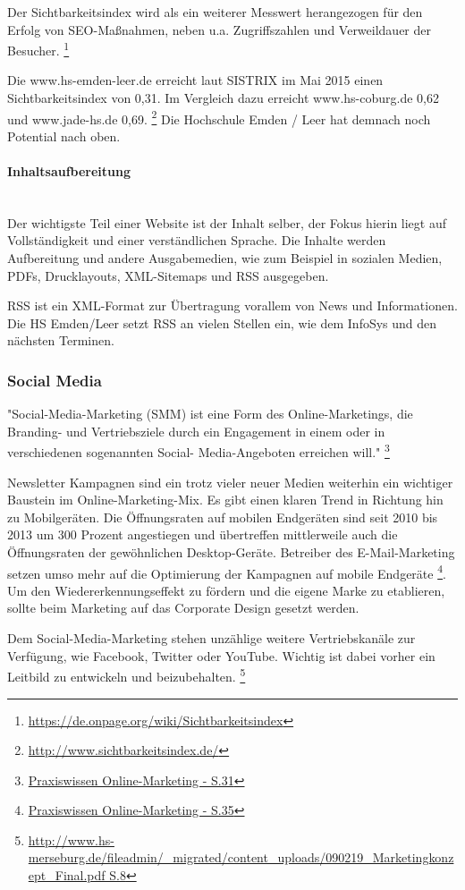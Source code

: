 \documentclass[a4paper, 12pt]{scrreprt}
\begin{document}
Der Sichtbarkeitsindex wird als ein weiterer Messwert herangezogen für den Erfolg von SEO-Maßnahmen, neben u.a. Zugriffszahlen und Verweildauer der Besucher. \footnote{\url{https://de.onpage.org/wiki/Sichtbarkeitsindex}}

Die www.hs-emden-leer.de erreicht laut SISTRIX im Mai 2015 einen Sichtbarkeitsindex von 0,31. Im Vergleich dazu erreicht www.hs-coburg.de 0,62 und www.jade-hs.de 0,69. \footnote{\url{http://www.sichtbarkeitsindex.de/}} Die Hochschule Emden / Leer hat demnach noch Potential nach oben.

\paragraph{Inhaltsaufbereitung}\mbox{}\\ %
Der wichtigste Teil einer Website ist der Inhalt selber, der Fokus hierin liegt auf Vollständigkeit und einer verständlichen Sprache. Die Inhalte werden Aufbereitung und andere Ausgabemedien, wie zum Beispiel in sozialen Medien, PDFs, Drucklayouts, XML-Sitemaps und RSS ausgegeben.

RSS ist ein XML-Format zur Übertragung vorallem von News und Informationen. Die HS Emden/Leer setzt RSS an vielen Stellen ein, wie dem InfoSys und den nächsten Terminen.

\subsubsection{Social Media}
"Social-Media-Marketing (SMM) ist eine Form des Online-Marketings, die Branding- und Vertriebsziele durch ein Engagement in einem oder in verschiedenen sogenannten Social- Media-Angeboten erreichen will." \footnote{\url{Praxiswissen Online-Marketing - S.31}}

Newsletter Kampagnen sind ein trotz vieler neuer Medien weiterhin ein wichtiger Baustein im Online-Marketing-Mix. Es gibt einen klaren Trend in Richtung hin zu Mobilgeräten. Die Öffnungsraten auf mobilen Endgeräten sind seit 2010 bis 2013 um 300 Prozent angestiegen und übertreffen mittlerweile auch die Öffnungsraten der gewöhnlichen Desktop-Geräte. Betreiber des E-Mail-Marketing setzen umso mehr auf die Optimierung der Kampagnen auf mobile Endgeräte \footnote{\url{Praxiswissen Online-Marketing - S.35}}. Um den Wiedererkennungseffekt zu fördern und die eigene Marke zu etablieren, sollte beim Marketing auf das Corporate Design gesetzt werden.

Dem Social-Media-Marketing stehen unzählige weitere Vertriebskanäle zur Verfügung, wie Facebook, Twitter oder YouTube. Wichtig ist dabei vorher ein Leitbild zu entwickeln und beizubehalten. \footnote{\url{http://www.hs-merseburg.de/fileadmin/_migrated/content_uploads/090219_Marketingkonzept_Final.pdf S.8}}
\end{document}
